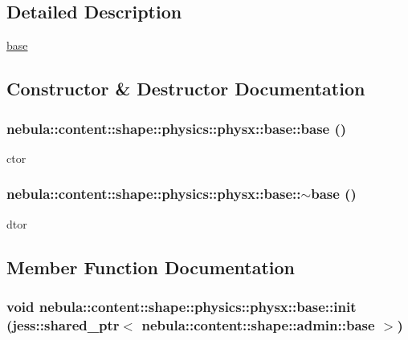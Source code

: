 \subsection{Detailed Description}
\hyperlink{classnebula_1_1content_1_1shape_1_1physics_1_1physx_1_1base}{base} 

\subsection{Constructor \& Destructor Documentation}
\hypertarget{classnebula_1_1content_1_1shape_1_1physics_1_1physx_1_1base_ac9abb1a1a202a87029a94abe99a7a45b}{
\subsubsection[{base}]{\setlength{\rightskip}{0pt plus 5cm}nebula::content::shape::physics::physx::base::base ()}}
\label{classnebula_1_1content_1_1shape_1_1physics_1_1physx_1_1base_ac9abb1a1a202a87029a94abe99a7a45b}


ctor \hypertarget{classnebula_1_1content_1_1shape_1_1physics_1_1physx_1_1base_afb35c7a19298a888ca4708a0e8f3891b}{
\subsubsection[{$\sim$base}]{\setlength{\rightskip}{0pt plus 5cm}nebula::content::shape::physics::physx::base::$\sim$base ()}}
\label{classnebula_1_1content_1_1shape_1_1physics_1_1physx_1_1base_afb35c7a19298a888ca4708a0e8f3891b}


dtor 

\subsection{Member Function Documentation}
\hypertarget{classnebula_1_1content_1_1shape_1_1physics_1_1physx_1_1base_adb58c357d53d98a575856439b6c30de0}{
\subsubsection[{init}]{\setlength{\rightskip}{0pt plus 5cm}void nebula::content::shape::physics::physx::base::init (jess::shared\_\-ptr$<$ {\bf nebula::content::shape::admin::base} $>$)}}
\label{classnebula_1_1content_1_1shape_1_1physics_1_1physx_1_1base_adb58c357d53d98a575856439b6c30de0}


